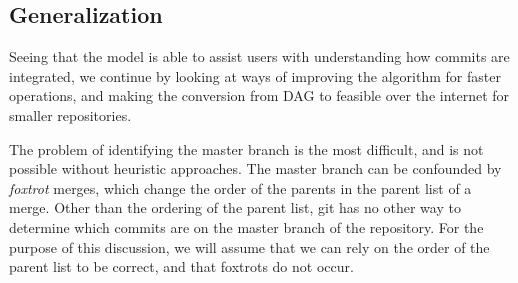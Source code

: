 
\subsection{Generalization}
\label{sub:generalization}

Seeing that the \mt model is able to assist users with understanding how
commits are integrated, we continue by looking at ways of improving the
algorithm for faster operations, and making the conversion from DAG to
\mt feasible over the internet for smaller repositories.

The problem of identifying the master branch is the most difficult, and is
not possible without heuristic approaches. The master branch can be
confounded by \textit{foxtrot} merges, which change the order of the
parents in the parent list of a merge. Other than the ordering of the
parent list, git has no other way to determine which commits are on the
master branch of the repository. For the purpose of this discussion, we
will assume that we can rely on the order of the parent list to be
correct, and that foxtrots do not occur.

